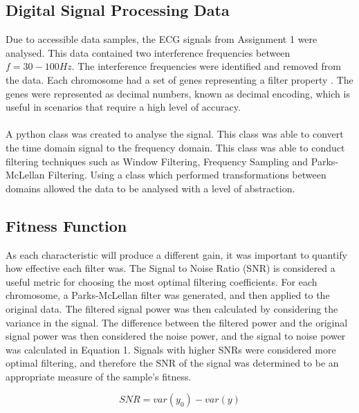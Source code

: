 \documentclass[a4paper, 11pt]{article}
\begin{document}
    \subsection{Digital Signal Processing Data}\label{sec:meth_sub1}
        Due to accessible data samples, the ECG signals from Assignment 1 were analysed. This data contained
        two interference frequencies between  $f = 30 - 100Hz$. The interference frequencies were identified and 
        removed from the data. Each chromosome had a set of genes representing a filter property \cite[]{Garip2018}. 
        The genes were represented as decimal numbers, known as decimal encoding, which is useful in scenarios that require a high
        level of accuracy. 
        \\\\
        A python class was created to analyse the signal. This class was able to convert the time domain signal to the
        frequency domain. This class was able to conduct filtering techniques such as Window
        Filtering, Frequency Sampling and Parks-McLellan Filtering. Using a class which performed transformations 
        between domains allowed the data to be analysed with a level of abstraction.

    \subsection{Fitness Function}\label{sec:meth_sub2}
        As each characteristic will produce a different gain, it was important to quantify how effective each filter was. 
        The Signal to Noise Ratio (SNR) is considered a useful metric for choosing the most optimal filtering coefficients. 
        For each chromosome, a Parks-McLellan filter was generated, and then applied to the original data. The filtered signal
        power was then calculated by considering the variance in the signal. The difference between the filtered power
        and the original signal power was then considered the noise power, and the signal to noise power was calculated in Equation 1. 
        Signals with higher SNRs were considered more optimal filtering, and therefore the SNR of the signal was determined
        to be an appropriate measure of the sample's fitness. 

        \begin{equation} SNR = var(y_{0}) - var(y)\end{equation}
\end{document}
